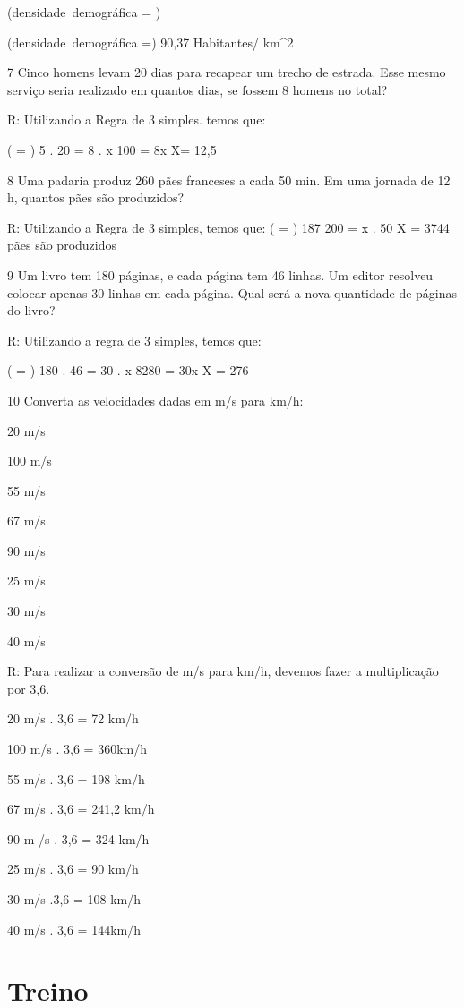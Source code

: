 {(densidade\ demográfica = )

(densidade\ demográfica =) 90,37 Habitantes/ km^2

\num{7} Cinco homens levam 20 dias para recapear um trecho de estrada. Esse
mesmo serviço seria realizado em quantos dias, se fossem 8 homens no
total?

R: Utilizando a Regra de 3 simples. temos que:

( = )
5 . 20 = 8 . x
100 = 8x
X= 12,5

\num{8} Uma padaria produz 260 pães franceses a cada 50 min. Em uma jornada
de 12 h, quantos pães são produzidos?

R: Utilizando a Regra de 3 simples, temos que:
( = )
187 200 = x . 50
X = 3744 pães são produzidos

\num{9} Um livro tem 180 páginas, e cada página tem 46 linhas. Um editor
resolveu colocar apenas 30 linhas em cada página. Qual será a nova
quantidade de páginas do livro?

R: Utilizando a regra de 3 simples, temos que:

( = )
180 . 46 = 30 . x
8280 = 30x
X = 276

\num{10} Converta as velocidades dadas em m/s para km/h:
\item 20 m/s
\item 100 m/s
\item 55 m/s
\item 67 m/s
\item 90 m/s
\item 25 m/s
\item 30 m/s
\item 40 m/s

R: Para realizar a conversão de m/s para km/h, devemos fazer a
multiplicação por 3,6.
\item 20 m/s . 3,6 = 72 km/h
\item 100 m/s . 3,6 = 360km/h
\item 55 m/s . 3,6 = 198 km/h
\item 67 m/s . 3,6 = 241,2 km/h
\item 90 m /s . 3,6 = 324 km/h
\item 25 m/s . 3,6 = 90 km/h
\item 30 m/s .3,6 = 108 km/h
\item 40 m/s . 3,6 = 144km/h

\section{Treino}

}

